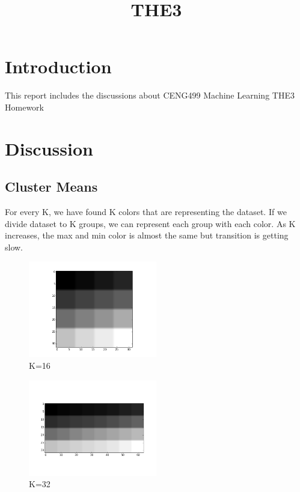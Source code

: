 \documentclass[conference]{IEEEtran}
\begin{document}
    \title{THE3\\
    }

    \author{
    }

    \maketitle


    \section{Introduction}
    This report includes the discussions about CENG499 Machine Learning THE3 Homework \\

    \section{Discussion}

    \subsection{Cluster Means}

    For every K, we have found K colors that are representing the dataset. If we divide dataset to K groups, we can represent each group with each color. As K increases, the max and min color is almost the same but transition is getting slow.

    \begin{figure}[htbp]
        \centerline{\includegraphics[width=0.5\textwidth]{16.png}}
        \caption{K=16}
        \label{k16}
    \end{figure}

    \begin{figure}[htbp]
        \centerline{\includegraphics[width=0.5\textwidth]{32.png}}
        \caption{K=32}
        \label{k32}
    \end{figure}
\end{document}
